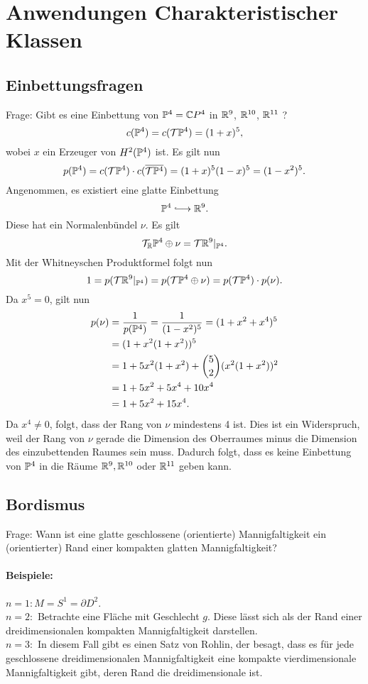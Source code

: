 \section{Anwendungen Charakteristischer Klassen}
\subsection{Einbettungsfragen}
Frage: Gibt es eine Einbettung von $\P^4 = \C P^4$ in $\R^9$, $\R^{10}$, $\R^{11}$ ?
\[ c(\P^4) = c(\T \P^4) = (1 + x)^5, \]
wobei $x$ ein Erzeuger von $H^2(\P^4)$ ist. Es gilt nun
\[ p(\P^4) = c(\T \P^4) \cdot c(\overline{\T \P^4}) = (1 + x)^5 (1-x)^5 = (1- x^2)^5. \]
Angenommen, es existiert eine glatte Einbettung
\[ \P^4 \Inj{} \R^9. \]
Diese hat ein Normalenbündel $\nu$. Es gilt
\[ \T_\R \P^4 \oplus \nu= \T \R^9|_{\P^4}.  \]
Mit der Whitneyschen Produktformel folgt nun
\[ 1=p(\T \R^9|_{\P^4})=p(\T \P^4 \oplus \nu) = p(\T \P^4) \cdot p(\nu). \]
Da $x^5 = 0$, gilt nun
\begin{align*}
p(\nu) &= \frac{1}{p(\P^4)} = \frac{1}{(1- x^2)^5} = (1 + x^2 + x^4)^5\\
&= (1 + x^2(1 + x^2))^5\\
&= 1 + 5x^2 (1 + x^2) + \binom{5}{2} (x^2 (1+ x^2))^2\\
&= 1 + 5x^2 + 5x^4 + 10x^4\\
&= 1 + 5x^2 + 15x^4.
\end{align*}
Da $x^4 \neq 0$, folgt, dass der Rang von $\nu$ mindestens 4 ist. Dies ist ein Widerspruch, weil der Rang von $\nu$ gerade die Dimension des Oberraumes minus die Dimension des einzubettenden Raumes sein muss. Dadurch folgt, dass es keine Einbettung von $\P^4$ in die Räume $\R^9,\R^{10}$ oder $\R^{11}$ geben kann.

\subsection{Bordismus}
Frage: Wann ist eine glatte geschlossene (orientierte) Mannigfaltigkeit ein (orientierter) Rand einer kompakten glatten Mannigfaltigkeit?

\paragraph{Beispiele:} $n = 1: M = S^1 = \partial D^2$.\\
$n = 2:$ Betrachte eine Fläche mit Geschlecht $g$. Diese lässt sich als der Rand einer dreidimensionalen kompakten Mannigfaltigkeit darstellen.\\
$n = 3:$ In diesem Fall gibt es einen Satz von Rohlin, der besagt, dass es für jede geschlossene dreidimensionalen Mannigfaltigkeit eine kompakte vierdimensionale Mannigfaltigkeit gibt, deren Rand die dreidimensionale ist.

